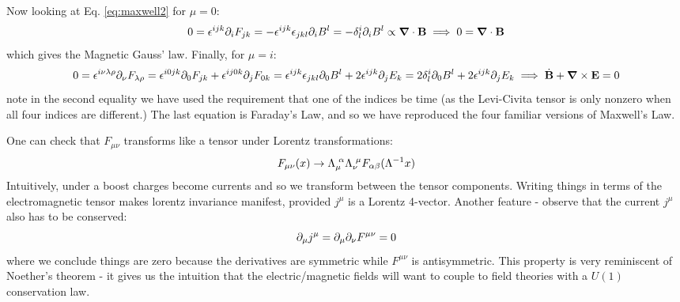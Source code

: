 Now looking at Eq. \eqref{eq:maxwell2} for $\mu = 0$:
\begin{equation}
    0 = \e^{ijk}\p_i F_{jk} = -\e^{ijk}\e_{jkl}\p_i B^l = -\delta^{i}_l \p_i B^l \propto \nabla \cdot \v{B} \implies 0 = \nabla \cdot \v{B}
\end{equation}
which gives the Magnetic Gauss' law. Finally, for $\mu = i$:
\begin{equation}
    0 = \e^{i\nu \lambda \rho}\p_\nu F_{\lambda \rho} = \e^{i0jk}\p_0 F_{jk} + \e^{ij0k}\p_j F_{0k} = \e^{ijk}\e_{jkl}\p_0 B^l + 2\e^{ijk}\p_j E_k = 2\delta^{i}_l \p_0 B^l + 2\e^{ijk}\p_j E_k \implies \dot{\v{B}} + \nabla \times \v{E} = 0
\end{equation}
note in the second equality we have used the requirement that one of the indices be time (as the Levi-Civita tensor is only nonzero when all four indices are different.) The last equation is Faraday's Law, and so we have reproduced the four familiar versions of Maxwell's Law.

One can check that $F_{\mu\nu}$ transforms like a tensor under Lorentz transformations:
\begin{equation}
    F_{\mu\nu}(x) \to \Lambda_{\mu}^{\sp\alpha}\Lambda_{\nu}^{\sp\mu}F_{\alpha\beta}(\Lambda^{-1}x)
\end{equation}
Intuitively, under a boost charges become currents and so we transform between the tensor components. Writing things in terms of the electromagnetic tensor makes lorentz invariance manifest, provided $j^\mu$ is a Lorentz 4-vector. Another feature - observe that the current $j^\mu$ also has to be conserved:
\begin{equation}
    \partial_\mu j^\mu = \partial_\mu \partial_\nu F^{\mu\nu} = 0
\end{equation}
where we conclude things are zero because the derivatives are symmetric while $F^{\mu\nu}$ is antisymmetric. This property is very reminiscent of Noether's theorem - it gives us the intuition that the electric/magnetic fields will want to couple to field theories with a $U(1)$ conservation law.

